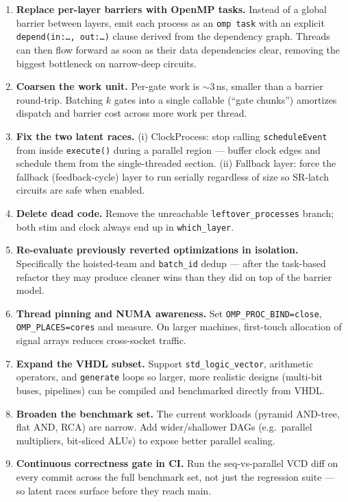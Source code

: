 \documentclass[9pt,a4paper]{article}
\begin{document}
\begin{enumerate}[leftmargin=1.5em,itemsep=3pt]
  \item \textbf{Replace per-layer barriers with OpenMP tasks.} Instead of a global barrier between layers, emit each process as an \texttt{omp task} with an explicit \texttt{depend(in:\dots, out:\dots)} clause derived from the dependency graph. Threads can then flow forward as soon as their data dependencies clear, removing the biggest bottleneck on narrow-deep circuits.
  \item \textbf{Coarsen the work unit.} Per-gate work is $\sim$3\,ns, smaller than a barrier round-trip. Batching $k$ gates into a single callable (``gate chunks'') amortizes dispatch and barrier cost across more work per thread.
  \item \textbf{Fix the two latent races.} (i) ClockProcess: stop calling \texttt{scheduleEvent} from inside \texttt{execute()} during a parallel region — buffer clock edges and schedule them from the single-threaded section. (ii) Fallback layer: force the fallback (feedback-cycle) layer to run serially regardless of size so SR-latch circuits are safe when enabled.
  \item \textbf{Delete dead code.} Remove the unreachable \texttt{leftover\_processes} branch; both stim and clock always end up in \texttt{which\_layer}.
  \item \textbf{Re-evaluate previously reverted optimizations in isolation.} Specifically the hoisted-team and \texttt{batch\_id} dedup — after the task-based refactor they may produce cleaner wins than they did on top of the barrier model.
  \item \textbf{Thread pinning and NUMA awareness.} Set \texttt{OMP\_PROC\_BIND=close}, \texttt{OMP\_PLACES=cores} and measure. On larger machines, first-touch allocation of signal arrays reduces cross-socket traffic.
  \item \textbf{Expand the VHDL subset.} Support \texttt{std\_logic\_vector}, arithmetic operators, and \texttt{generate} loops so larger, more realistic designs (multi-bit buses, pipelines) can be compiled and benchmarked directly from VHDL.
  \item \textbf{Broaden the benchmark set.} The current workloads (pyramid AND-tree, flat AND, RCA) are narrow. Add wider/shallower DAGs (e.g.\ parallel multipliers, bit-sliced ALUs) to expose better parallel scaling.
  \item \textbf{Continuous correctness gate in CI.} Run the seq-vs-parallel VCD diff on every commit across the full benchmark set, not just the regression suite — so latent races surface before they reach main.
\end{enumerate}
\end{document}
